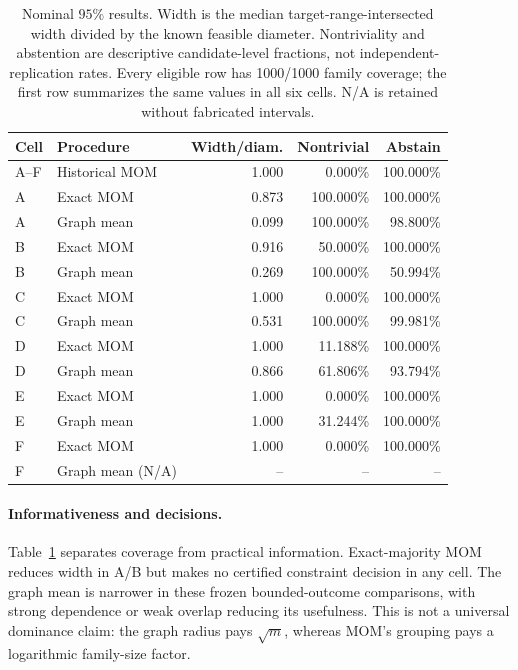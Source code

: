 \begin{table}[t]
\centering\small
\begin{tabular}{@{}llrrr@{}}
\toprule
Cell & Procedure & Width/diam. & Nontrivial & Abstain \\
\midrule
A--F & Historical MOM & 1.000 & 0.000\% & 100.000\% \\
A & Exact MOM & 0.873 & 100.000\% & 100.000\% \\
A & Graph mean & 0.099 & 100.000\% & 98.800\% \\
B & Exact MOM & 0.916 & 50.000\% & 100.000\% \\
B & Graph mean & 0.269 & 100.000\% & 50.994\% \\
C & Exact MOM & 1.000 & 0.000\% & 100.000\% \\
C & Graph mean & 0.531 & 100.000\% & 99.981\% \\
D & Exact MOM & 1.000 & 11.188\% & 100.000\% \\
D & Graph mean & 0.866 & 61.806\% & 93.794\% \\
E & Exact MOM & 1.000 & 0.000\% & 100.000\% \\
E & Graph mean & 1.000 & 31.244\% & 100.000\% \\
F & Exact MOM & 1.000 & 0.000\% & 100.000\% \\
F & Graph mean (N/A) & -- & -- & -- \\
\bottomrule
\end{tabular}
\caption{Nominal $95\%$ results. Width is the median target-range-intersected width divided by the known feasible diameter. Nontriviality and abstention are descriptive candidate-level fractions, not independent-replication rates. Every eligible row has 1000/1000 family coverage; the first row summarizes the same values in all six cells. N/A is retained without fabricated intervals.}
\label{tab:frozen-cstat}
\end{table}

\paragraph{Informativeness and decisions.}
Table~\ref{tab:frozen-cstat} separates coverage from practical information. Exact-majority MOM reduces width in A/B but makes no certified constraint decision in any cell. The graph mean is narrower in these frozen bounded-outcome comparisons, with strong dependence or weak overlap reducing its usefulness. This is not a universal dominance claim: the graph radius pays $\sqrt m$, whereas MOM's grouping pays a logarithmic family-size factor.


